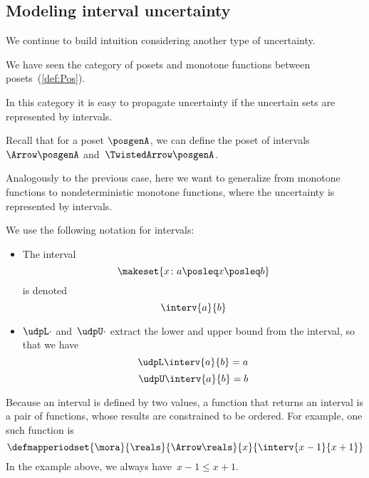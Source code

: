 \subsection{Modeling interval uncertainty}

We continue to build intuition considering another type of uncertainty.

We have seen the category \Pos of posets and monotone functions between posets~(\cref{def:Pos}).

In this category it is easy to propagate uncertainty if the uncertain sets are represented by intervals.

Recall that for a poset $\posgenA$, we can define the poset of intervals~$\Arrow\posgenA$ and~$\TwistedArrow\posgenA$.

Analogously to the previous case, here we want to generalize from monotone functions to nondeterministic monotone functions, where the uncertainty is represented by intervals.

We use the following notation for intervals:
\begin{itemize}
    \item The interval
          \begin{equation}
              \label{eq:interv-1}
              \makeset{x\colon a \posleq x \posleq b}
          \end{equation}
          is denoted
          \begin{equation}
              \label{eq:interv-2}
              \interv{a}{b}
          \end{equation}
    \item $\udpL\cdot$ and~$\udpU\cdot$ extract the lower and upper bound from the interval, so that we have
          \begin{equation}
              \label{eq:interv-L}
              \udpL \interv{a}{b} = a
          \end{equation}
          \begin{equation}
              \label{eq:interv-U}
              \udpU \interv{a}{b} = b
          \end{equation}
\end{itemize}
%
Because an interval is defined by two values, a function that returns an interval is a pair of functions, whose results are constrained to be ordered. For example, one such function is
\begin{equation}
    \label{eq:interval-func-example}
    \defmapperiodset{\mora}{\reals}{\Arrow\reals}%
    {x}{ \interv{x-1}{x+1}
    }
\end{equation}
In the example above, we always have~$x-1\leq x+1$.

